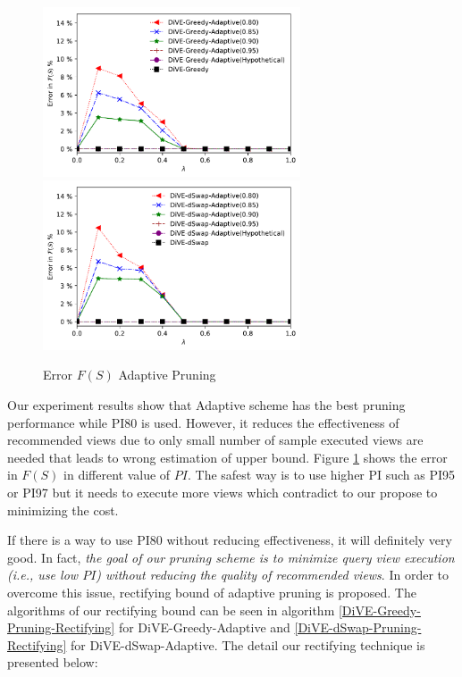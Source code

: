 \documentclass{article}
\begin{document}
\begin{figure}
	\begin{center}
		\vspace{-15pt}
		\includegraphics[width=3.0in]{figures/rectifiying_error_f_s_greedy}
		\includegraphics[width=3.0in]{figures/rectifiying_error_f_s_dswap}
		\caption{Error $F(S)$ Adaptive Pruning}
		\label{fig:error_fs_adaptive}
	\end{center}
\end{figure}

Our experiment results show that Adaptive scheme has the best pruning performance while PI80 is used. However, it reduces the effectiveness of recommended views due to only small number of sample executed views are needed that leads to wrong estimation of upper bound. Figure \ref{fig:error_fs_adaptive} shows the error in $F(S)$ in different value of $PI$. The safest way is to use higher PI such as PI95 or PI97 but it needs to execute more views which contradict to our propose to minimizing the cost.  

If there is a way to use PI80 without reducing effectiveness, it will definitely very good. In fact, \textit{the goal of our pruning scheme is to minimize query view execution (i.e., use low $PI$) without reducing the quality of recommended views}. In order to overcome this issue, rectifying bound of adaptive pruning is proposed. The algorithms of our rectifying bound can be seen in algorithm \ref{DiVE-Greedy-Pruning-Rectifying} for DiVE-Greedy-Adaptive and \ref{DiVE-dSwap-Pruning-Rectifying} for DiVE-dSwap-Adaptive. The detail our rectifying technique is presented below:
\end{document}
